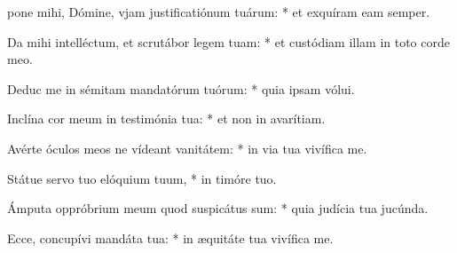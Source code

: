 \begin{psalmus}

 pone mihi, Dómine, vjam justificatiónum tuárum: * et exquíram eam semper.

Da mihi intelléctum, et scrutábor legem tuam: * et custódiam illam in toto corde meo.

Deduc me in sémitam mandatórum tuórum: * quia ipsam vólui.

Inclína cor meum in testimónia tua: * et non in avarítiam.

Avérte óculos meos ne vídeant vanitátem: * in via tua vivífica me.

Státue servo tuo elóquium tuum, * in timóre tuo.

Ámputa oppróbrium meum quod suspicátus sum: * quia judícia tua jucúnda.

Ecce, concupívi mandáta tua: * in æquitáte tua vivífica me.

\end{psalmus}
